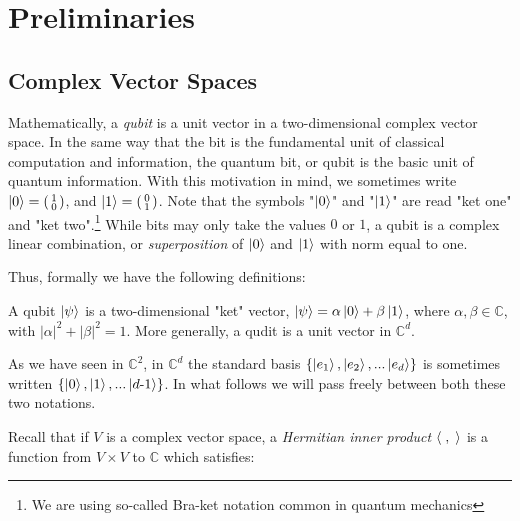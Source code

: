 
\chapter{Preliminaries} %

\label{Chapter2-preliminaries} %


\section{Complex Vector Spaces}

Mathematically, a {\emph{qubit}} is a unit vector in a two-dimensional complex vector space.  In the same way that the bit is the fundamental unit of classical computation and information, the quantum bit, or qubit is the basic unit of quantum information.  With this motivation in mind, we sometimes write $\ket{0} = \left(\begin{smallmatrix}1\\0\end{smallmatrix}\right)$, and $\ket{1} = \left(\begin{smallmatrix}0\\1\end{smallmatrix}\right)$. Note that the symbols "$\ket{0}$" and "$\ket{1}$" are read "ket one" and "ket two".\footnote{We are using so-called Bra-ket notation common in quantum mechanics}  While bits may only take the values $0$ or $1$, a qubit is a complex linear combination, or \textit{superposition} of $\ket{0}$ and $\ket{1}$ with norm equal to one. 

Thus, formally we have the following definitions:
\begin{definition}[Qubit]
A qubit $\ket{\psi}$ is a two-dimensional "ket" vector, $\ket{\psi}=\alpha\ket{0}+\beta\ket{1}$, 
where $\alpha,\beta\in\mathbb{C}$, with $|\alpha|^2+|\beta|^2=1$.
More generally, a qudit is a unit vector in ${\mathbb{C}}^d$.
\end{definition}



As we have seen in ${\mathbb{C}}^2$, in ${\mathbb{C}}^d$ the standard basis $\{\ket{e_1}, \ket{e_2}, ... \ket{e_d} \}$ is sometimes written $\{\ket{0}, \ket{1}, ...\ket{d\textrm{-}1}\}$.  In what follows we will pass freely between both these two notations.


Recall that if $V$ is a complex vector space, a {\emph{Hermitian inner product}} $\langle\hspace{.1cm},\hspace{.1cm}\rangle$ is a function from $V \times V$ to $\mathbb{C}$ which satisfies: 

